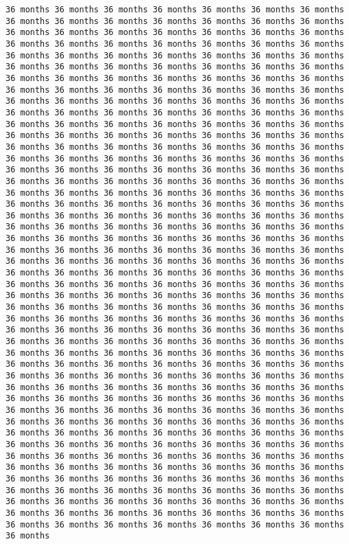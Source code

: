 \documentclass[11pt]{article}
\begin{document}
\begin{Verbatim}[commandchars=\\\{\}, frame=single, framerule=2mm, rulecolor=\color{outerrorbackground}]
36 months 36 months 36 months 36 months 36 months 36 months 36 months 36 months 36 months 36 months 36 months 36 months 36 months 36 months 36 months 36 months 36 months 36 months 36 months 36 months 36 months 36 months 36 months 36 months 36 months 36 months 36 months 36 months 36 months 36 months 36 months 36 months 36 months 36 months 36 months 36 months 36 months 36 months 36 months 36 months 36 months 36 months 36 months 36 months 36 months 36 months 36 months 36 months 36 months 36 months 36 months 36 months 36 months 36 months 36 months 36 months 36 months 36 months 36 months 36 months 36 months 36 months 36 months 36 months 36 months 36 months 36 months 36 months 36 months 36 months 36 months 36 months 36 months 36 months 36 months 36 months 36 months 36 months 36 months 36 months 36 months 36 months 36 months 36 months 36 months 36 months 36 months 36 months 36 months 36 months 36 months 36 months 36 months 36 months 36 months 36 months 36 months 36 months 36 months 36 months 36 months 36 months 36 months 36 months 36 months 36 months 36 months 36 months 36 months 36 months 36 months 36 months 36 months 36 months 36 months 36 months 36 months 36 months 36 months 36 months 36 months 36 months 36 months 36 months 36 months 36 months 36 months 36 months 36 months 36 months 36 months 36 months 36 months 36 months 36 months 36 months 36 months 36 months 36 months 36 months 36 months 36 months 36 months 36 months 36 months 36 months 36 months 36 months 36 months 36 months 36 months 36 months 36 months 36 months 36 months 36 months 36 months 36 months 36 months 36 months 36 months 36 months 36 months 36 months 36 months 36 months 36 months 36 months 36 months 36 months 36 months 36 months 36 months 36 months 36 months 36 months 36 months 36 months 36 months 36 months 36 months 36 months 36 months 36 months 36 months 36 months 36 months 36 months 36 months 36 months 36 months 36 months 36 months 36 months 36 months 36 months 36 months 36 months 36 months 36 months 36 months 36 months 36 months 36 months 36 months 36 months 36 months 36 months 36 months 36 months 36 months 36 months 36 months 36 months 36 months 36 months 36 months 36 months 36 months 36 months 36 months 36 months 36 months 36 months 36 months 36 months 36 months 36 months 36 months 36 months 36 months 36 months 36 months 36 months 36 months 36 months 36 months 36 months 36 months 36 months 36 months 36 months 36 months 36 months 36 months 36 months 36 months 36 months 36 months 36 months 36 months 36 months 36 months 36 months 36 months 36 months 36 months 36 months 36 months 36 months 36 months 36 months 36 months 36 months 36 months 36 months 36 months 36 months 36 months 36 months 36 months 36 months 36 months 36 months 36 months 36 months 36 months 36 months 36 months 36 months 36 months 36 months 36 months 36 months 36 months 36 months 36 months 36 months 36 months 36 months 36 months 36 months 36 months 36 months 36 months 36 months 36 months 36 months 36 months 36 months 36 months 36 months 36 months 36 months 36 months 36 months 36 months 36 months 36 months 36 months 36 months 36 months 36 months 36 months 36 months 36 months 36 months 36 months 36 months 36 months 36 months 36 months 36 months 
\end{Verbatim}
\end{document}
